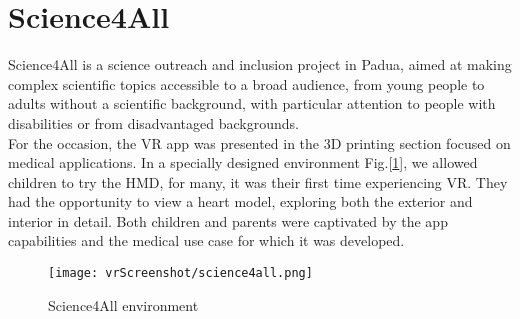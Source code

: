 \section{Science4All}
\noindent
Science4All is a science outreach and inclusion project in Padua, aimed at making complex scientific topics accessible to a broad audience,
from young people to adults without a scientific background, with particular attention to people with disabilities or from disadvantaged backgrounds.\\
For the occasion, the \ac{VR} app was presented in the 3D printing section focused on medical applications. In a specially designed environment Fig.[\ref{fig:science4all}], we allowed children to try the \ac{HMD}, for many, it was their first time experiencing \ac{VR}. They had the opportunity to view a heart model, exploring both the exterior and interior in detail.
Both children and parents were captivated by the app capabilities and the medical use case for which it was developed.

\begin{figure}[ht]
  \centering
  \texttt{[image: vrScreenshot/science4all.png]}
  \caption{Science4All environment}
  \label{fig:science4all}
\end{figure}
